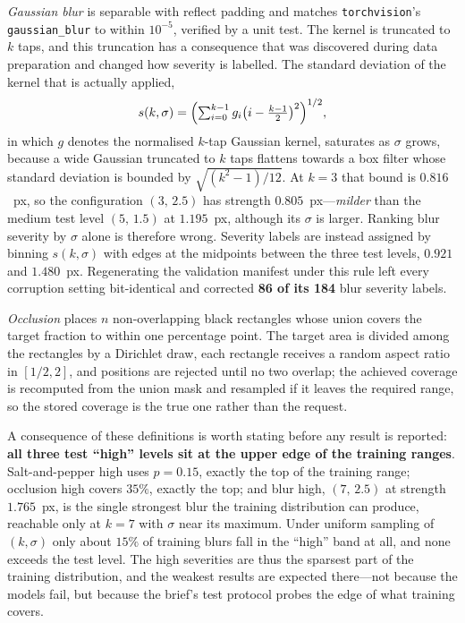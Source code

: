 \documentclass[conference]{IEEEtran}
\begin{document}
\emph{Gaussian blur} is separable with reflect padding and matches
\texttt{torchvision}'s \texttt{gaussian\_blur} to within $10^{-5}$, verified by a
unit test. The kernel is truncated to $k$ taps, and this truncation has a
consequence that was discovered during data preparation and changed how
severity is labelled. The standard deviation of the kernel that is actually
applied,
\begin{equation}
  s(k,\sigma) = \Bigl( \textstyle\sum_{i=0}^{k-1} g_i \bigl(i - \tfrac{k-1}{2}\bigr)^2 \Bigr)^{1/2},
  \label{eq:blurstrength}
\end{equation}
in which $g$ denotes the normalised $k$-tap Gaussian kernel,
saturates as $\sigma$ grows, because a wide Gaussian truncated to $k$ taps
flattens towards a box filter whose standard deviation is bounded by
$\sqrt{(k^2-1)/12}$. At $k=3$ that bound is $0.816$~px, so the configuration
$(3,\,2.5)$ has strength $0.805$~px---\emph{milder} than the medium test level
$(5,\,1.5)$ at $1.195$~px, although its $\sigma$ is larger. Ranking blur severity
by $\sigma$ alone is therefore wrong. Severity labels are instead assigned by
binning $s(k,\sigma)$ with edges at the midpoints between the three test levels,
$0.921$ and $1.480$~px. Regenerating the validation manifest under this rule
left every corruption setting bit-identical and corrected \textbf{86 of its 184}
blur severity labels.

\emph{Occlusion} places $n$ non-overlapping black rectangles whose union covers
the target fraction to within one percentage point. The target area is divided
among the rectangles by a Dirichlet draw, each rectangle receives a random
aspect ratio in $[1/2, 2]$, and positions are rejected until no two overlap;
the achieved coverage is recomputed from the union mask and resampled if it
leaves the required range, so the stored coverage is the true one rather than
the request.

A consequence of these definitions is worth stating before any result is
reported: \textbf{all three test ``high'' levels sit at the upper edge of the
training ranges}. Salt-and-pepper high uses $p = 0.15$, exactly the top of the
training range; occlusion high covers $35\%$, exactly the top; and blur high,
$(7,\,2.5)$ at strength $1.765$~px, is the single strongest blur the training
distribution can produce, reachable only at $k=7$ with $\sigma$ near its maximum.
Under uniform sampling of $(k,\sigma)$ only about $15\%$ of training blurs fall
in the ``high'' band at all, and none exceeds the test level. The high severities
are thus the sparsest part of the training distribution, and the weakest results
are expected there---not because the models fail, but because the brief's test
protocol probes the edge of what training covers.
\end{document}
